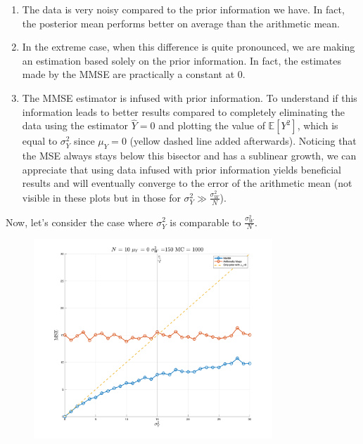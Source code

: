 \begin{enumerate}
    \item The data is very noisy compared to the prior information we have. In fact, the posterior mean performs better on average than the arithmetic mean.
    \item In the extreme case, when this difference is quite pronounced, we are making an estimation based solely on the prior information. In fact, the estimates made by the MMSE are practically a constant at $0$.
    \item The MMSE estimator is infused with prior information. To understand if this information leads to better results compared to completely eliminating the data using the estimator $\hat Y=0$ and plotting the value of $\mathbb E [Y^2]$, which is equal to $\sigma^2_Y$ since $\mu_Y=0$ (yellow dashed line added afterwards).
          Noticing that the MSE always stays below this bisector and has a sublinear growth, we can appreciate that using data infused with prior information yields beneficial results and will eventually converge to the error of the arithmetic mean (not visible in these plots but in those for $\sigma^2_Y\gg \frac{\sigma^2_W}{N}$).
\end{enumerate}

Now, let's consider the case where $\sigma^2_Y$ is comparable to $\frac {\sigma^2_W}N$.

\begin{figure}[H]
    \centering
    \includegraphics[width=0.8\textwidth]{./figures/appendix_a/figure_12.png}
\end{figure}

